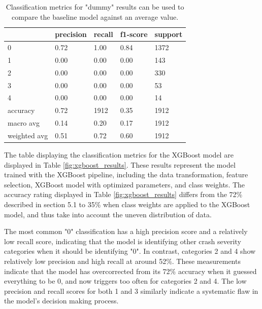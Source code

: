 \documentclass[12pt]{article}
\begin{document}
\begin{table}[h]
\begin{center}
\begin{tabular}{lllll}
\hline
             & precision & recall & f1-score & support     \\ \hline
0            & 0.72   & 1.00     & 0.84    & 1372 \\
1            & 0.00   & 0.00     & 0.00    & 143  \\
2            & 0.00   & 0.00     & 0.00    & 330  \\
3            & 0.00   & 0.00     & 0.00    & 53   \\
4            & 0.00   & 0.00     & 0.00    & 14   \\
accuracy     & 0.72   & 1912     & 0.35    & 1912 \\
macro avg    & 0.14   & 0.20     & 0.17    & 1912 \\
weighted avg & 0.51   & 0.72     & 0.60    & 1912
\end{tabular}
  \caption{Classification metrics for "dummy" results can be used to compare the baseline model against an average value.}
  \label{fig:dummy_results}
\end{center}
\end{table}

The table displaying the classification metrics for the XGBoost model are displayed in Table \ref{fig:xgboost_results}. These results
represent the model trained with the XGBoost pipeline, including the data transformation, feature selection, XGBoost model with 
optimized parameters, and class weights. The accuracy rating displayed in Table \ref{fig:xgboost_results} differs from the 72\%
described in section 5.1 to 35\% when class weights are applied to the XGBoost model, and thus
take into account the uneven distribution of data. 

The most common "0" classification has a high precision score and a relatively low recall score, indicating that the model
is identifying other crash severity categories when it should be identifying "0". In contrast, categories 2 and 4 show
relatively low precision and high recall at around 52\%. These measurements indicate that the model has overcorrected 
from its 72\% accuracy when it guessed everything to be 0, and now triggers too often for categories 2 and 4. The
low precision and recall scores for both 1 and 3 similarly indicate a systematic flaw in the model's decision making
process.
 
\end{document}
